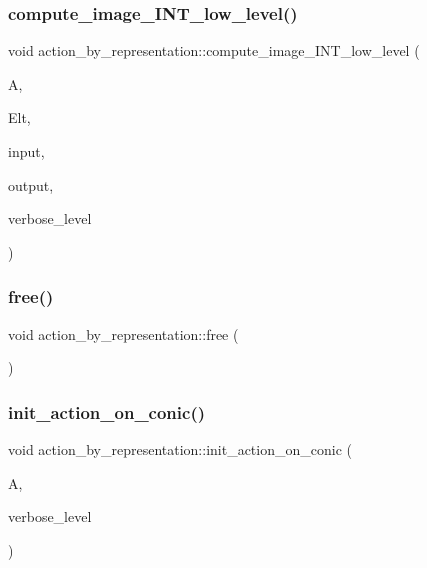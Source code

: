 \subsubsection{\texorpdfstring{compute\+\_\+image\+\_\+\+I\+N\+T\+\_\+low\+\_\+level()}{compute\_image\_INT\_low\_level()}}
{\footnotesize\ttfamily void action\+\_\+by\+\_\+representation\+::compute\+\_\+image\+\_\+\+I\+N\+T\+\_\+low\+\_\+level (\begin{DoxyParamCaption}\item[{\mbox{\hyperlink{classaction}{action}} \&}]{A,  }\item[{\mbox{\hyperlink{galois_8h_a09fddde158a3a20bd2dcadb609de11dc}{I\+NT}} $\ast$}]{Elt,  }\item[{\mbox{\hyperlink{galois_8h_a09fddde158a3a20bd2dcadb609de11dc}{I\+NT}} $\ast$}]{input,  }\item[{\mbox{\hyperlink{galois_8h_a09fddde158a3a20bd2dcadb609de11dc}{I\+NT}} $\ast$}]{output,  }\item[{\mbox{\hyperlink{galois_8h_a09fddde158a3a20bd2dcadb609de11dc}{I\+NT}}}]{verbose\+\_\+level }\end{DoxyParamCaption})}

\mbox{\label{classaction__by__representation_a5c15d8c83b57bf274020672890e1e1f3}} 
\subsubsection{\texorpdfstring{free()}{free()}}
{\footnotesize\ttfamily void action\+\_\+by\+\_\+representation\+::free (\begin{DoxyParamCaption}{ }\end{DoxyParamCaption})}

\mbox{\label{classaction__by__representation_af671877ad58ec641e3ddbc3917a6f367}} 
\subsubsection{\texorpdfstring{init\+\_\+action\+\_\+on\+\_\+conic()}{init\_action\_on\_conic()}}
{\footnotesize\ttfamily void action\+\_\+by\+\_\+representation\+::init\+\_\+action\+\_\+on\+\_\+conic (\begin{DoxyParamCaption}\item[{\mbox{\hyperlink{classaction}{action}} \&}]{A,  }\item[{\mbox{\hyperlink{galois_8h_a09fddde158a3a20bd2dcadb609de11dc}{I\+NT}}}]{verbose\+\_\+level }\end{DoxyParamCaption})}

